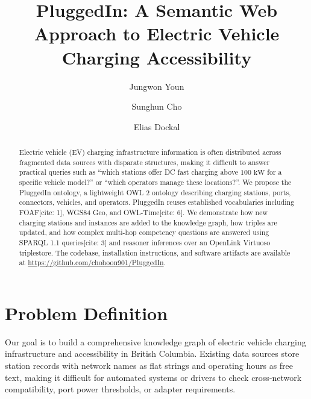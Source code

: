 \documentclass[sigconf]{acmart}
\begin{document}
\title{PluggedIn: A Semantic Web Approach to Electric Vehicle Charging Accessibility}

\author{Jungwon Youn}

\author{Sunghun Cho}

\author{Elias Dockal}

\begin{abstract}
Electric vehicle (EV) charging infrastructure information is often distributed across fragmented data sources with disparate structures, making it difficult to answer practical queries such as ``which stations offer DC fast charging above $100\text{ kW}$ for a specific vehicle model?'' or ``which operators manage these locations?''. We propose the PluggedIn ontology, a lightweight OWL 2 ontology describing charging stations, ports, connectors, vehicles, and operators. PluggedIn reuses established vocabularies including FOAF[cite: 1], WGS84 Geo, and OWL-Time[cite: 6]. We demonstrate how new charging stations and instances are added to the knowledge graph, how triples are updated, and how complex multi-hop competency questions are answered using SPARQL 1.1 queries[cite: 3] and reasoner inferences over an OpenLink Virtuoso triplestore. The codebase, installation instructions, and software artifacts are available at \url{https://github.com/chohoon901/PluggedIn}.
\end{abstract}


\maketitle

\section{Problem Definition}
Our goal is to build a comprehensive knowledge graph of electric vehicle charging infrastructure and accessibility in British Columbia. Existing data sources store station records with network names as flat strings and operating hours as free text, making it difficult for automated systems or drivers to check cross-network compatibility, port power thresholds, or adapter requirements.
\end{document}
